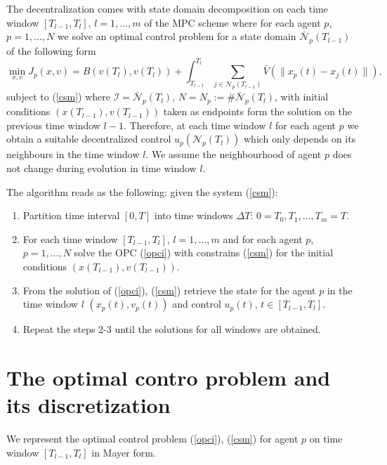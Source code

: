 \documentclass[a4paper,10pt, english]{article}
\begin{document}
 The decentralization comes with state domain decomposition on each time window $[T_{l-1}, T_{l}]$, $l = 1, \dots, m$  of the MPC scheme where for each agent $p$, $p = 1, \dots, N$ we solve an optimal control problem for a state domain $\bar{\mathcal{N}}_p(T_{l-1})$ of the following form
  \begin{equation}
  \min_{x, v} J_p(x, v) = B(v(T_l), v(T_l)) + \int_{T_{l-1}}^{T_l}\sum_{j\in \mathcal{N}_p(T_{l-1})} \bar{V}(\|x_p(t) - x_j(t)\|),
 \label{opci}
 \end{equation}
 subject to (\ref{csm}) where $\mathcal{I} = \bar{\mathcal{N}}_p(T_l)$,  $N = N_p:= \# \bar{\mathcal{N}}_p(T_l)$, with initial conditions $(x(T_{l-1}), v(T_{l-1}))$ taken as endpoints form the solution on the previous time window $l-1$.
 Therefore, at each time window $l$ for each agent $p$ we obtain a suitable decentralized control $u_p(\mathcal{N}_p(T_l))$ which only depends on its neighbours in the time window $l$.
We assume the neighbourhood of agent $p$ does not change during evolution in time window $l$.

   The algorithm reads as the following: given the system (\ref{csm}):
   \begin{enumerate}
   \item Partition time interval $[0, T]$ into time windows $\Delta T$: $0 = T_0, T_1, \dots, T_m = T$.
   \item For each time window  $[T_{l-1}, T_{l}]$, $l = 1, \dots, m$ and for each agent $p$, $p = 1, \dots, N$  solve the OPC (\ref{opci}) with constrains (\ref{csm}) for the initial conditions $(x(T_{l-1}), v(T_{l-1}))$.
   \item From the solution of (\ref{opci}), (\ref{csm})  retrieve the  state for the agent $p$ in the time window $l$ $(x_p(t), v_p(t))$ and control $u_p(t)$, $t\in [T_{l-1}, T_{l}]$.
   \item Repeat the steps 2-3 until the solutions for all windows are obtained. 
 \end{enumerate}
 



 
 
 \section{The optimal contro problem and its discretization}
  We represent the optimal control problem  (\ref{opci}), (\ref{csm}) for agent $p$ on time window $[T_{l-1}, T_{l}]$ in Mayer form.
  
\end{document}
